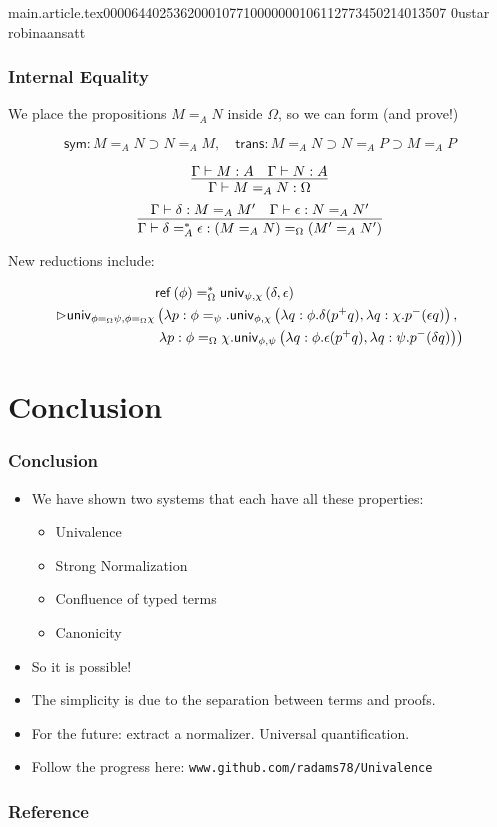 main.article.tex                                                                                    0000644 0253620 0010771 00000001061 12773450214 013507  0                                                                                                    ustar   robina                          ansatt                                                                                                                                                                                                                 \documentclass{article}
\newcommand{\url}[1]{\texttt{#1}}
\begin{document}
\begin{frame}
\frametitle{Internal Equality}
We place the propositions $M =_A N$ inside $\Omega$,
so we can form (and prove!)

\[ \mathsf{sym} : M =_A N \supset N =_A M , \quad
\mathsf{trans} : M =_A N \supset N =_A P \supset M =_A P \]

\[ \infer{\Gamma \vdash M =_A N : \Omega}{\Gamma \vdash M : A \quad \Gamma \vdash N : A} \]
\[ \infer{\Gamma \vdash \delta =^*_A \epsilon : (M =_A N) =_\Omega (M' =_A N')}
{\Gamma \vdash \delta : M =_A M' \quad \Gamma \vdash \epsilon : N =_A N'} \]

New reductions include:

\begin{align*}
& \mathsf{ref} \left( {\phi} \right) =^*_\Omega \mathsf{univ}_{{\psi} , {\chi}} \left( {\delta} , {\epsilon} \right) \\ \rhd 
  \mathsf{univ}_{\phi =_\Omega \psi,\phi =_\Omega \chi}
& \left( \lambda p:\phi =_\psi. \mathsf{univ}_{{\phi} , {\chi}} \left( {\lambda q:\phi.\delta (p^+ q)} , {\lambda q : \chi. p^- (\epsilon q)} \right), \right. \\ 
&  \left. \lambda p:\phi =_\Omega \chi. \mathsf{univ}_{{\phi} , {\psi}} \left( {\lambda q:\phi. \epsilon (p^+ q)} , {\lambda q : \psi. p^- (\delta q)} \right) \right) \\
\end{align*}
\end{frame}

\section{Conclusion}

\begin{frame}
\frametitle{Conclusion}
\begin{itemize}[<+->]
\item
We have shown two systems that each have all these properties:
\begin{itemize}
\item
Univalence
\item
Strong Normalization
\item
Confluence of typed terms
\item
Canonicity
\end{itemize}
\item
So it is possible!
\item
The simplicity is due to the separation between terms and proofs.
\item
For the future: extract a normalizer.  Universal quantification.
\item
Follow the progress here: \url{www.github.com/radams78/Univalence}
\end{itemize}
\end{frame}

\appendix

\begin{frame}
\frametitle{Reference}

\end{frame}
\end{document}
